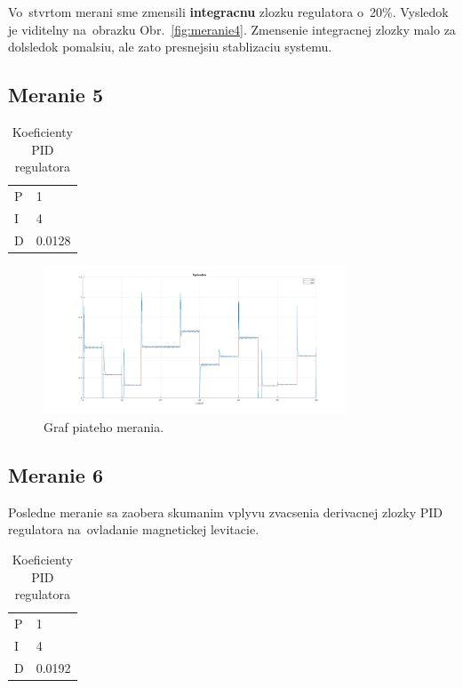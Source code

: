 \documentclass{article}
\begin{document}
Vo~stvrtom merani sme zmensili \textbf{integracnu} zlozku regulatora o~20\%. Vysledok je viditelny
na~obrazku Obr.~\ref{fig:meranie4}. Zmensenie integracnej zlozky malo za dolsledok pomalsiu, ale zato
presnejsiu stablizaciu systemu.

\clearpage

\subsection{Meranie 5}
\label{sec:meranie5}

\begin{table}[!htbp]
	\caption{Koeficienty PID regulatora}
	\label{tab:t5}
	\begin{center}
		\begin{tabular}[c]{|l|l|}
			\hline
			P & 1 \\
			I & 4 \\
			D & 0.0128 \\
			\hline
		\end{tabular}
	\end{center}
\end{table}

\begin{figure}[!htbp]
	\begin{center}
		\includegraphics[width=0.8\textwidth]{./include/m5.png}
	\end{center}
	\caption{Graf piateho merania.}
	\label{fig:meranie5}
\end{figure}

\clearpage

\subsection{Meranie 6}
\label{sec:meranie6}


Posledne meranie sa zaobera skumanim vplyvu zvacsenia derivacnej zlozky PID regulatora na~ovladanie magnetickej levitacie.


\begin{table}[!htbp]
	\caption{Koeficienty PID regulatora}
	\label{tab:t6}
	\begin{center}
		\begin{tabular}[c]{|l|l|}
			\hline
			P & 1 \\
			I & 4 \\
			D & 0.0192 \\
			\hline
		\end{tabular}
	\end{center}
\end{table}
\end{document}
